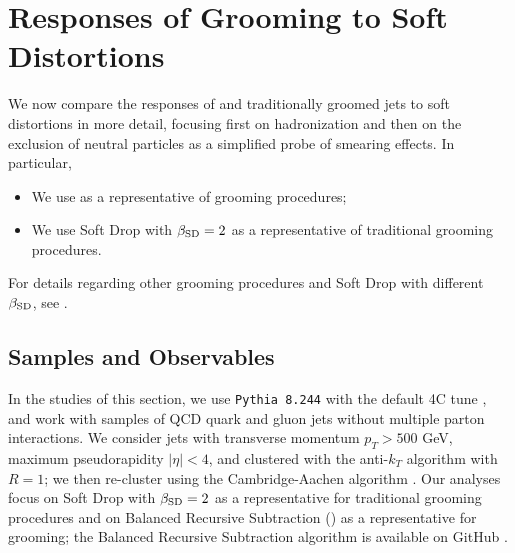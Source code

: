 \section{Responses of Grooming to Soft Distortions}
\label{sec:soft_distortion}

We now compare the responses of \PIRANHA{} and traditionally groomed jets to soft distortions in more detail, focusing first on hadronization and then on the exclusion of neutral particles as a simplified probe of smearing effects.
%
In particular,
\begin{itemize}
    \item We use  as a representative of \PIRANHA{} grooming procedures;
    \item We use Soft Drop with \(\beta_{\rm SD} = 2\) as a representative of traditional grooming procedures.
\end{itemize}
%
For details regarding other \PIRANHA{} grooming procedures and Soft Drop with different \(\beta_{\rm SD}\), see .


\subsection{Samples and Observables}
In the studies of this section, we use \texttt{Pythia 8.244} \cite{Sjostrand:2014zea} with the default 4C tune \cite{Corke:2010yf}, and work with samples of QCD quark and gluon jets without multiple parton interactions.
%
We consider jets with transverse momentum \(p_T > 500\) GeV, maximum pseudorapidity \(|\eta| < 4\), and clustered with the anti-\(k_T\) algorithm \cite{Cacciari:2008gp} with \(R = 1\);
%
we then re-cluster using the Cambridge-Aachen algorithm \cite{Dokshitzer:1997in}.
%
Our analyses focus on Soft Drop with \(\beta_{\rm SD} = 2\) as a representative for traditional grooming procedures and on Balanced Recursive Subtraction () as a representative for \PIRANHA{} grooming;
%
the Balanced Recursive Subtraction algorithm is available on GitHub \cite{piranhagithub}.

